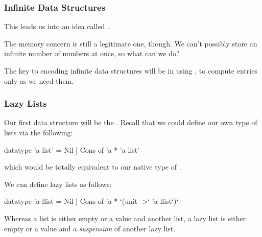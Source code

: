 \documentclass[aspectratio=169]{beamer}
\begin{document}
\begin{frame}[fragile]
  \frametitle{Infinite Data Structures}

  This leads us into an idea called .

  \vspace{\fill}


  \pause
  \vspace{\fill}

  The memory concern is still a legitimate one, though. We can't possibly store
  an infinite number of numbers at once, so what can we do?

  \pause
  \vspace{\fill}

  The key to encoding infinite data structures will be in using ,
  to compute entries only as we need them.
\end{frame}

\begin{frame}[fragile]
  \frametitle{Lazy Lists}

  \rprs

  Our first data structure will be the . Recall that
  we could define our own type of lists via the following:
  \begin{codeblock}
    datatype 'a list' = Nil | Cons of 'a * 'a list'
  \end{codeblock}
  which would be totally equivalent to our native type of .

  \pause
  \vspace{\fill}

  We can define lazy lists as follows:
  \begin{codeblock}
    datatype 'a llist = Nil | Cons of 'a * `(unit ->` 'a llist`)`
  \end{codeblock}

  \pause
  \vspace{\fill}

  Whereas a list is either empty or a value and another list, a lazy list
  is either empty or a value and a \textit{suspension} of another lazy list.
\end{frame}
\end{document}
